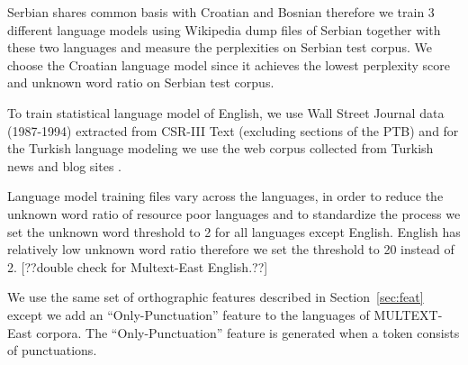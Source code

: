 Serbian shares common basis with Croatian and Bosnian therefore we
train 3 different language models using Wikipedia dump files of
Serbian together with these two languages and measure the perplexities
on Serbian test corpus.  We choose the Croatian language model since
it achieves the lowest perplexity score and unknown word ratio on
Serbian test corpus.

To train statistical language model of English, we use Wall Street
Journal data (1987-1994) extracted from CSR-III Text \cite{csr3text}
(excluding sections of the PTB) and for the Turkish language modeling
we use the web corpus collected from Turkish news and blog sites
\cite{sak2008turkish}.

Language model training files vary across the languages, in order to
reduce the unknown word ratio of resource poor languages and to
standardize the process we set the unknown word threshold to 2 for all
languages except English.  English has relatively low unknown word
ratio therefore we set the threshold to 20 instead of 2. [??double
  check for Multext-East English.??]

We use the same set of orthographic features described in
Section~\ref{sec:feat} except we add an ``Only-Punctuation'' feature
to the languages of MULTEXT-East corpora.  The ``Only-Punctuation''
feature is generated when a token consists of punctuations.

